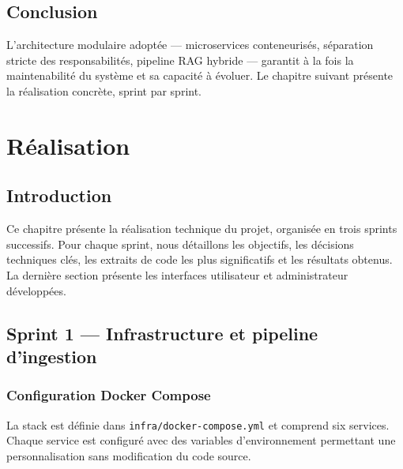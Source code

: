 \documentclass[12pt,a4paper]{report}
\begin{document}
\section{Conclusion}

L'architecture modulaire adoptée — microservices conteneurisés, séparation stricte des
responsabilités, pipeline RAG hybride — garantit à la fois la maintenabilité du système et
sa capacité à évoluer. Le chapitre suivant présente la réalisation concrète, sprint par sprint.

\chapter{Réalisation}
\minitoc
\newpage

\section{Introduction}

Ce chapitre présente la réalisation technique du projet, organisée en trois sprints
successifs. Pour chaque sprint, nous détaillons les objectifs, les décisions techniques clés,
les extraits de code les plus significatifs et les résultats obtenus. La dernière section
présente les interfaces utilisateur et administrateur développées.

\section{Sprint 1 — Infrastructure et pipeline d'ingestion}

\subsection{Configuration Docker Compose}

La stack est définie dans \texttt{infra/docker-compose.yml} et comprend six services.
Chaque service est configuré avec des variables d'environnement permettant une
personnalisation sans modification du code source.
\end{document}

